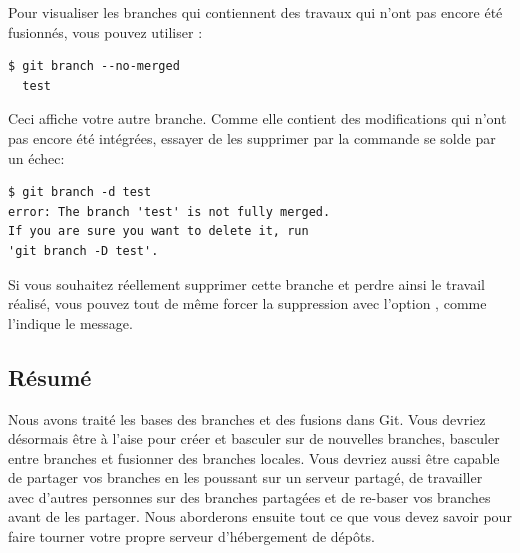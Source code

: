 Pour visualiser les branches qui contiennent des travaux qui n'ont pas encore été fusionnés, vous pouvez utiliser   :
\begin{Schunk}
\begin{Verbatim}
$ git branch --no-merged
  test
\end{Verbatim}
\end{Schunk}

Ceci affiche votre autre branche.
Comme elle contient des modifications qui n'ont pas encore été intégrées, essayer de les supprimer par la commande  se solde par un échec:
\begin{Schunk}
\begin{Verbatim}
$ git branch -d test
error: The branch 'test' is not fully merged.
If you are sure you want to delete it, run
'git branch -D test'.
\end{Verbatim}
\end{Schunk}

Si vous souhaitez réellement supprimer cette branche et perdre ainsi le travail réalisé, vous pouvez tout de même forcer la suppression avec l'option , comme l'indique le message.

\subsection{Résumé}

Nous avons traité les bases des branches et des fusions dans Git.
Vous devriez désormais être à l'aise pour créer et basculer sur de nouvelles branches, basculer entre branches et fusionner des branches locales.
Vous devriez aussi être capable de partager vos branches en les poussant sur un serveur partagé, de travailler avec d'autres personnes sur des branches partagées et de re-baser vos branches avant de les partager.
Nous aborderons ensuite tout ce que vous devez savoir pour faire tourner votre propre serveur d'hébergement de dépôts.

\endgroup                       %

